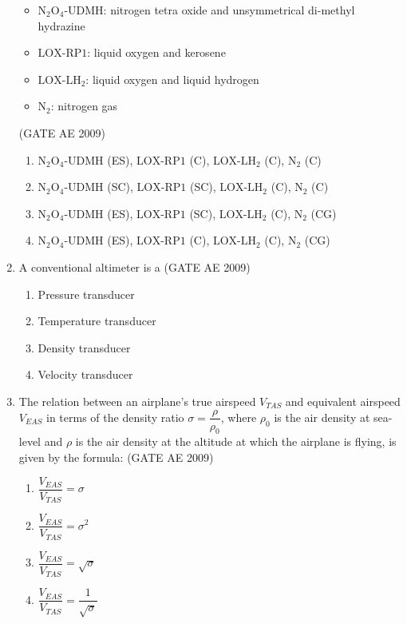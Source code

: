 \documentclass[journal,12pt,onecolumn]{IEEEtran}
\theoremstyle{remark}
\begin{document}
\begin{flushleft}
\begin{enumerate}
\begin{itemize}
\item \( \mathrm{N_2O_4\text{-}UDMH} \): nitrogen tetra oxide and unsymmetrical di-methyl hydrazine  
\item \( \mathrm{LOX\text{-}RP1} \): liquid oxygen and kerosene  
\item \( \mathrm{LOX\text{-}LH_2} \): liquid oxygen and liquid hydrogen  
\item \( \mathrm{N_2} \): nitrogen gas  
\end{itemize}
\hfill(GATE AE 2009)
\begin{multicols}{2}
\begin{enumerate}
\item \( \mathrm{N_2O_4\text{-}UDMH} \) (ES), \( \mathrm{LOX\text{-}RP1} \) (C), \( \mathrm{LOX\text{-}LH_2} \) (C), \( \mathrm{N_2} \) (C)
\item \( \mathrm{N_2O_4\text{-}UDMH} \) (SC), \( \mathrm{LOX\text{-}RP1} \) (SC), \( \mathrm{LOX\text{-}LH_2} \) (C), \( \mathrm{N_2} \) (C)
\item \( \mathrm{N_2O_4\text{-}UDMH} \) (ES), \( \mathrm{LOX\text{-}RP1} \) (SC), \( \mathrm{LOX\text{-}LH_2} \) (C), \( \mathrm{N_2} \) (CG)
\item \( \mathrm{N_2O_4\text{-}UDMH} \) (ES), \( \mathrm{LOX\text{-}RP1} \) (C), \( \mathrm{LOX\text{-}LH_2} \) (C), \( \mathrm{N_2} \) (CG)
\end{enumerate}
\end{multicols}

\item 
A conventional altimeter is a
\hfill(GATE AE 2009)
\begin{multicols}{2}
\begin{enumerate}
\item Pressure transducer
\item Temperature transducer
\item Density transducer
\item Velocity transducer
\end{enumerate}
\end{multicols}

\item 
The relation between an airplane's true airspeed \(V_{TAS}\) and equivalent airspeed \(V_{EAS}\) in terms of the density ratio \(\sigma = \dfrac{\rho}{\rho_0}\), where \(\rho_0\) is the air density at sea-level and \(\rho\) is the air density at the altitude at which the airplane is flying, is given by the formula:
\hfill(GATE AE 2009)
\begin{multicols}{2}
\begin{enumerate}
\item \(\dfrac{V_{EAS}}{V_{TAS}} = \sigma\)
\item \(\dfrac{V_{EAS}}{V_{TAS}} = \sigma^2\)
\item \(\dfrac{V_{EAS}}{V_{TAS}} = \sqrt{\sigma}\)
\item \(\dfrac{V_{EAS}}{V_{TAS}} = \dfrac{1}{\sqrt{\sigma}}\)
\end{enumerate}
\end{multicols}


\end{enumerate}
\end{flushleft}
\end{document}
